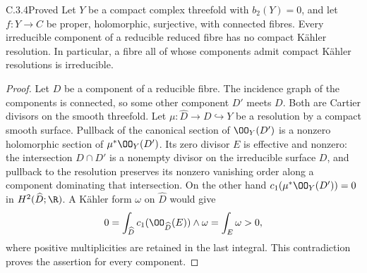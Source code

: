 \begin{idstatement}{C.3.4}{Proved}\label{st:C.3.4}
Let $Y$ be a compact complex threefold with $b_2(Y)=0$, and let
$f:Y\to C$ be proper, holomorphic, surjective, with connected fibres.
Every irreducible component of a reducible reduced fibre has no
compact K\"ahler resolution. In particular, a fibre all of whose
components admit compact K\"ahler resolutions is irreducible.
\end{idstatement}
\begin{proof}
Let $D$ be a component of a reducible fibre. The incidence graph of
the components is connected, so some other component $D'$ meets $D$.
Both are Cartier divisors on the smooth threefold. Let
$\mu:\widehat D\to D\hookrightarrow Y$ be a resolution by a compact
smooth surface. Pullback of the canonical section of $\OO_Y(D')$
is a nonzero holomorphic section of $\mu^*\OO_Y(D')$. Its zero
divisor $E$ is effective and nonzero: the intersection $D\cap D'$
is a nonempty divisor on the irreducible surface $D$, and pullback
to the resolution preserves its nonzero vanishing order along a
component dominating that intersection. On the other hand
$c_1(\mu^*\OO_Y(D'))=0$ in $H^2(\widehat D;\R)$.
A K\"ahler form $\omega$ on $\widehat D$ would give
\[
0=\int_{\widehat D}c_1(\OO_{\widehat D}(E))\wedge\omega
 =\int_E\omega>0,
\]
where positive multiplicities are retained in the last integral.
This contradiction proves the assertion for every component.
\end{proof}



